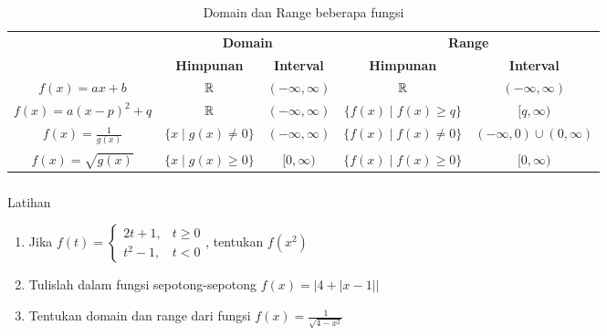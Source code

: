 \documentclass{../../kalkulus-ppt}
\begin{document}
\begin{frame}
    \frametitle{\insertsection}
    \begin{table}
        \centering
        \begin{tabular}{|c|c|c|c|c|}
            \hline
            \rowcolor{HIMAmuda}
                                                & \multicolumn{2}{c|}{\textbf{Domain}} & \multicolumn{2}{c|}{\textbf{Range}}                                                           \\
            \cline{2-5}
            \rowcolor{HIMAmuda}
            \multirow{-2}{*}{\textbf{Fungsi}}   & \textbf{Himpunan}                    & \textbf{Interval}                   & \textbf{Himpunan}         & \textbf{Interval}           \\
            \hline
            $f(x)=ax+b$                         & $\mathbb{R}$                                 & $(-\infty,\infty)$                  & $\mathbb{R}$                      & $(-\infty,\infty)$          \\
            $f(x)=a(x-p)^2+q$                   & $\mathbb{R}$                                 & $(-\infty,\infty)$                  & $\{f(x)\mid f(x)\geq q\}$ & $[q,\infty)$                \\
            $\displaystyle f(x)=\frac{1}{g(x)}$ & $\{x\mid g(x)\ne 0\}$                & $(-\infty,\infty)$                  & $\{f(x)\mid f(x)\ne 0\}$  & $(-\infty,0)\cup(0,\infty)$ \\
            $f(x)=\sqrt{g(x)}$                  & $\{x\mid g(x)\geq 0\}$               & $[0,\infty)$                        & $\{f(x)\mid f(x)\geq 0\}$ & $[0,\infty)$                \\
            \hline
        \end{tabular}
        \caption{Domain dan Range beberapa fungsi}
    \end{table}
\end{frame}

\begin{frame}
    \frametitle{\insertsection}
    \begin{exampleblock}{Latihan}
        \begin{enumerate}
            \item Jika $f(t)=\begin{cases}
                          2t+1,  & t\geq 0 \\
                          t^2-1, & t<0
                      \end{cases}$, tentukan $f(x^2)$
            \item Tulislah dalam fungsi sepotong-sepotong $f(x)=|4+|x-1||$
            \item Tentukan domain dan range dari fungsi $\displaystyle f(x)=\frac{1}{\sqrt{4-x^2}}$
        \end{enumerate}
    \end{exampleblock}
\end{frame}
\end{document}
